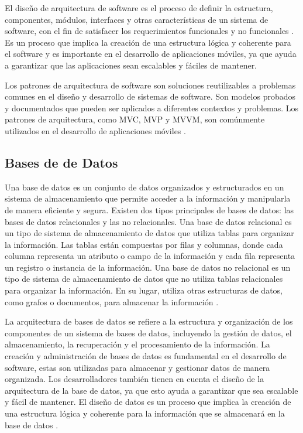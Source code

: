 \documentclass[runningheads]{llncs}
\begin{document}
            El diseño de arquitectura de software es el proceso de definir la estructura, componentes, módulos, interfaces y otras características de un sistema de software, con el fin de satisfacer los requerimientos funcionales y no funcionales \cite{Cita9,Cita11}. Es un proceso que implica la creación de una estructura lógica y coherente para el software y es importante en el desarrollo de aplicaciones móviles, ya que ayuda a garantizar que las aplicaciones sean escalables y fáciles de mantener.

            Los patrones de arquitectura de software son soluciones reutilizables a problemas comunes en el diseño y desarrollo de sistemas de software. Son modelos probados y documentados que pueden ser aplicados a diferentes contextos y problemas. Los patrones de arquitectura, como MVC, MVP y MVVM, son comúnmente utilizados en el desarrollo de aplicaciones móviles \cite{Cita11}. 

        \subsection{Bases de de Datos}
            Una base de datos es un conjunto de datos organizados y estructurados en un sistema de almacenamiento que permite acceder a la información y manipularla de manera eficiente y segura. Existen dos tipos principales de bases de datos: las bases de datos relacionales y las no relacionales. Una base de datos relacional es un tipo de sistema de almacenamiento de datos que utiliza tablas para organizar la información. Las tablas están compuestas por filas y columnas, donde cada columna representa un atributo o campo de la información y cada fila representa un registro o instancia de la información. Una base de datos no relacional es un tipo de sistema de almacenamiento de datos que no utiliza tablas relacionales para organizar la información. En su lugar, utiliza otras estructuras de datos, como grafos o documentos, para almacenar la información \cite{Cita12}.

            La arquitectura de bases de datos se refiere a la estructura y organización de los componentes de un sistema de bases de datos, incluyendo la gestión de datos, el almacenamiento, la recuperación y el procesamiento de la información. La creación y administración de bases de datos es fundamental en el desarrollo de software, estas son utilizadas para almacenar y gestionar datos de manera organizada. Los desarrolladores también tienen en cuenta el diseño de la arquitectura de la base de datos, ya que esto ayuda a garantizar que sea escalable y fácil de mantener. El diseño de datos es un proceso que implica la creación de una estructura lógica y coherente para la información que se almacenará en la base de datos \cite{Cita13}. 
\end{document}
